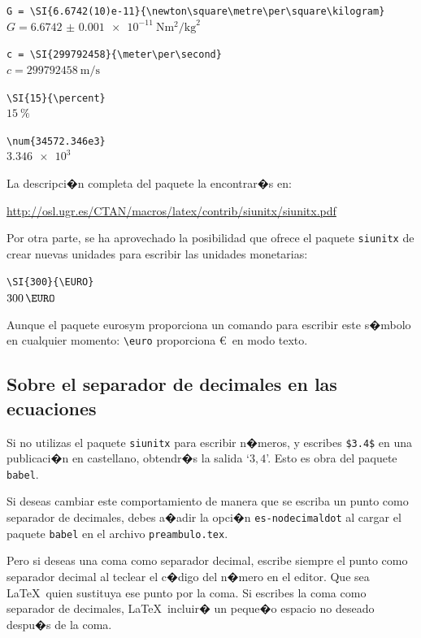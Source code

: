 \verb'G = \SI{6.6742(10)e-11}{\newton\square\metre\per\square\kilogram}'\\[1ex]
$G = \SI{6.6742(10)e-11}{\newton\square\metre\per\square\kilogram}$

\verb'c = \SI{299792458}{\meter\per\second}'\\[1ex]
$c = \SI{299792458}{\meter\per\second}$

\verb'\SI{15}{\percent}'\\[1ex]
$\SI{15}{\percent}$

\verb'\num{34572.346e3}'\\[1ex]
$\num{3.346e3}$

La descripci�n completa del paquete la encontrar�s en:

{\small\url{http://osl.ugr.es/CTAN/macros/latex/contrib/siunitx/siunitx.pdf}}

Por otra parte, se ha aprovechado la posibilidad que ofrece el paquete \texttt{siunitx} de crear nuevas unidades para escribir las unidades monetarias:

\verb'\SI{300}{\EURO}'\\[1ex]
$\SI{300}{\EURO}$

Aunque el paquete eurosym proporciona un comando para escribir este s�mbolo en cualquier momento: \verb'\euro' proporciona \euro\ en modo texto.

\subsection{Sobre el separador de decimales en las ecuaciones}
\label{sec:manual:separadorDecimals}


Si no utilizas el paquete \texttt{siunitx} para escribir n�meros, y escribes \verb'$3.4$' en una publicaci�n en castellano, obtendr�s la salida `$3,\!4$'. Esto es obra del paquete \texttt{babel}. 

Si deseas cambiar este comportamiento de manera que se escriba un punto como separador de decimales, debes a�adir la opci�n \texttt{es-nodecimaldot} al cargar el paquete \texttt{babel} en el archivo \texttt{preambulo.tex}.

Pero si deseas una coma como separador decimal, escribe siempre el punto como separador decimal al teclear el c�digo del n�mero en el editor. Que sea \LaTeX\ quien sustituya ese punto por la coma. Si escribes la coma como separador de decimales, \LaTeX\ incluir� un peque�o espacio no deseado despu�s de la coma.




